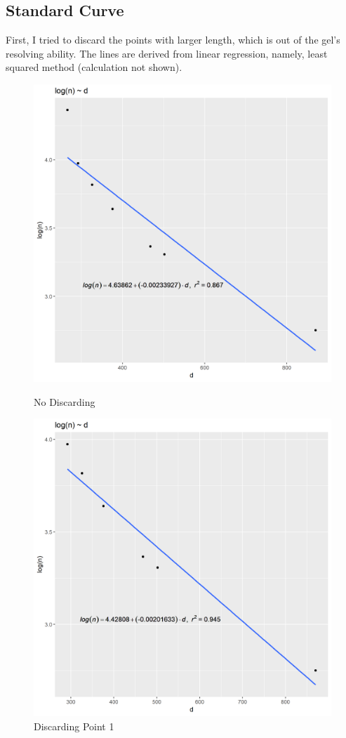 \documentclass{article}
\begin{document}
        \subsection{Standard Curve}
            First, I tried to discard the points with larger length, which is out of the gel's resolving ability. The lines are derived from linear regression, namely, least squared method (calculation not shown).
            \begin{figure}[H]
                \begin{minipage}[t]{0.5\textwidth}
                    \centering
                    \includegraphics[width = 0.8\linewidth]{../Data/discard_1.png}
                    \caption{No Discarding}
                    \label{dis.0}
                \end{minipage}
                \begin{minipage}[t]{0.5\textwidth}
                    \centering
                    \includegraphics[width = 0.8\linewidth]{../Data/discard_2.png}
                    \caption{Discarding Point 1}
                    \label{dis.1}
                \end{minipage}
            \end{figure}
\end{document}
